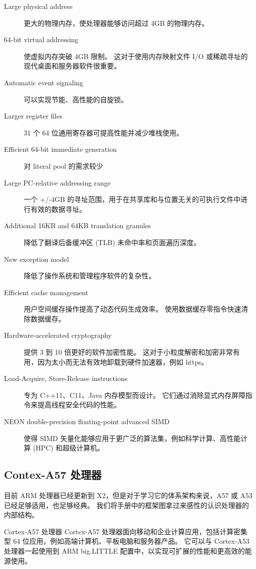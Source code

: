 \begin{description}
    \item[Large physical address] 更大的物理内存，使处理器能够访问超过 4GB 的物理内存。
    \item[64-bit virtual addressing] 使虚拟内存突破 4GB 限制。
    这对于使用内存映射文件 I/O 或稀疏寻址的现代桌面和服务器软件很重要。
    \item[Automatic event signaling] 可以实现节能、高性能的自旋锁。
    \item[Larger register files] 31 个 64 位通用寄存器可提高性能并减少堆栈使用。
    \item[Efficient 64-bit immediate generation] 对 literal pool 的需求较少
    \item[Large PC-relative addressing range] 一个 +/‑4GB 的寻址范围，用于在共享库和与位置无关的可执行文件中进行有效的数据寻址。
    \item[Additional 16KB and 64KB translation granules] 降低了翻译后备缓冲区 (TLB) 未命中率和页面遍历深度。
    \item[New exception model] 降低了操作系统和管理程序软件的复杂性。
    \item[Efficient cache management] 用户空间缓存操作提高了动态代码生成效率。
    使用数据缓存零指令快速清除数据缓存。
    \item[Hardware-accelerated cryptography] 提供 3 到 10 倍更好的软件加密性能。
    这对于小粒度解密和加密非常有用，因为太小而无法有效地卸载到硬件加速器，例如 https。
    \item[Load-Acquire, Store-Release instructions] 专为 C++11、C11、Java 内存模型而设计。
    它们通过消除显式内存屏障指令来提高线程安全代码的性能。
    \item[NEON double-precision floating-point advanced SIMD] 使得 SIMD 矢量化能够应用于更广泛的算法集，例如科学计算、高性能计算 (HPC) 和超级计算机。
\end{description}

\subsection{Contex-A57 处理器}

目前 ARM 处理器已经更新到 X2，但是对于学习它的体系架构来说，A57 或 A53 已经足够适用，也足够经典。
我们将手册中的框架图拿过来感性的认识处理器的内部结构。

Cortex‑A57 处理器 Cortex‑A57 处理器面向移动和企业计算应用，包括计算密集型 64 位应用，例如高端计算机、平板电脑和服务器产品。
它可以与 Cortex‑A53 处理器一起使用到 ARM big.LITTLE 配置中，以实现可扩展的性能和更高效的能源使用。

